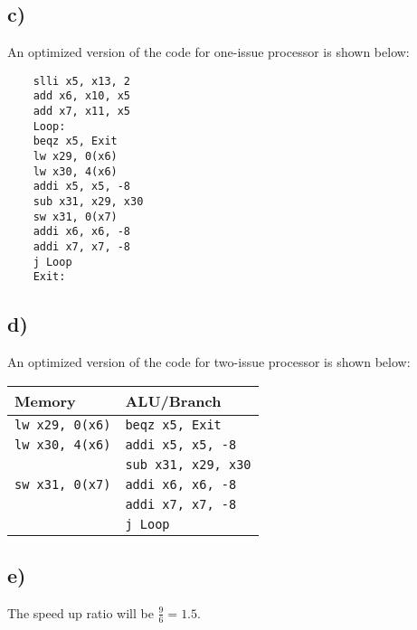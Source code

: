 \documentclass[a4paper,12pt]{article}
\begin{document}
\subsection*{c)}

An optimized version of the code for one-issue processor is shown below:
\begin{verbatim}
	slli x5, x13, 2
	add x6, x10, x5
	add x7, x11, x5
	Loop: 
	beqz x5, Exit
	lw x29, 0(x6)
	lw x30, 4(x6)
	addi x5, x5, -8
	sub x31, x29, x30
	sw x31, 0(x7)
	addi x6, x6, -8
	addi x7, x7, -8
	j Loop
	Exit:
\end{verbatim}

\subsection*{d)}

An optimized version of the code for two-issue processor is shown below:

\begin{center}
	\begin{tabular}{|l|l|}
		\hline
		Memory & ALU/Branch \\ \hline
		\texttt{lw x29, 0(x6)} & \texttt{beqz x5, Exit} \\ \hline
		\texttt{lw x30, 4(x6)} & \texttt{addi x5, x5, -8} \\ \hline
		& \texttt{sub x31, x29, x30} \\ \hline
		\texttt{sw x31, 0(x7)} & \texttt{addi x6, x6, -8} \\ \hline
		& \texttt{addi x7, x7, -8} \\ \hline
		& \texttt{j Loop} \\ \hline
	\end{tabular}
\end{center}

\subsection*{e)}

The speed up ratio will be $\frac{9}{6} = 1.5$.
\end{document}
